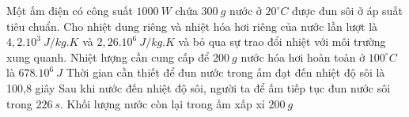 \begin{ex} 
	Một ấm điện có công suất $1000 \ W$ chứa $300 \ g$ nước ở $20^\circ C$ được đun sôi ở áp suất tiêu chuẩn. Cho nhiệt dung riêng và nhiệt hóa hơi riêng của nước lần lượt là $4,2 . 10^3 \ J /kg.K$ và $2,26 . 10^{6} \ J /kg.K$ và bỏ qua sự trao đổi nhiệt với môi trường xung quanh.
	{Nhiệt lượng cần cung cấp để $200 \ g$ nước hóa hơi hoàn toàn ở $100^\circ C$ là $678.10^{6} \ J$}
	{\True Thời gian cần thiết để đun nước trong ấm đạt đến nhiệt độ sôi là 100,8 giây}
	{\True Sau khi nước đến nhiệt độ sôi, người ta để ấm tiếp tục đun nước sôi trong $226 \ s$. Khối lượng nước còn lại trong ấm xấp xỉ $200 \ g$}
\end{ex}		

